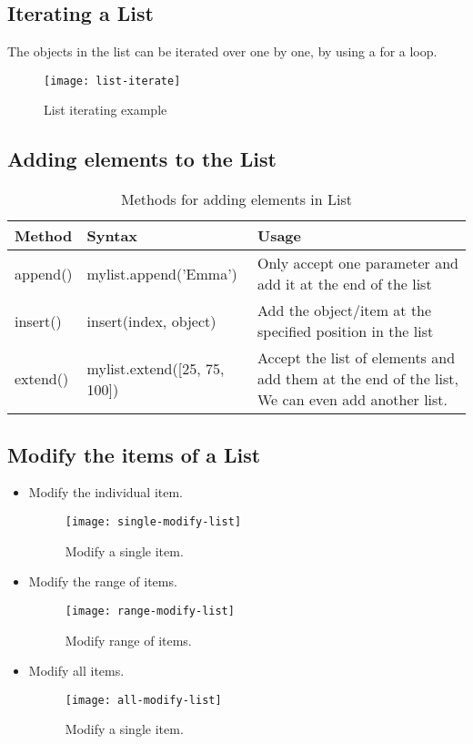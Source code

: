 \subsection{Iterating a List}
The objects in the list can be iterated over one by one, by using a for a loop.
\begin{figure}[h]
	\centering
	\texttt{[image: list-iterate]}
	\caption{List iterating example}
	\label{fig:list-iterate}
\end{figure}

\subsection{Adding elements to the List}
\begin{table}[h!]
	\centering
	\begin{tabularx}{\textwidth}{|l|l|X|}
		\hline
		\textbf{Method} & \textbf{Syntax} & \textbf{Usage} \\
		\hline
		append() & mylist.append('Emma') & Only accept one parameter and add it at the end of the list \\
		\hline
		insert() & insert(index, object) & Add the object/item at the specified position in the list \\
		\hline
		extend() & mylist.extend([25, 75, 100]) & Accept the list of elements and add them at the end of the list, We can even add another list. \\
		\hline

	\end{tabularx}
	\caption{Methods for adding elements in List}
	\label{tab:list-add-opers}
\end{table}

\subsection{Modify the items of a List}

\begin{itemize}
	\item Modify the individual item.
		\begin{figure}[h]
			\centering
			\texttt{[image: single-modify-list]}
			\caption{Modify a single item.}
			\label{fig:list-single-modify-list}
		\end{figure}
	\newpage
	\item Modify the range of items.
		\begin{figure}[h]
			\centering
			\texttt{[image: range-modify-list]}
			\caption{Modify range of items.}
			\label{fig:list-range-modify-list}
		\end{figure}
	\item Modify all items.
		\begin{figure}[h]
			\centering
			\texttt{[image: all-modify-list]}
			\caption{Modify a single item.}
			\label{fig:list-all-modify-list}
		\end{figure}
\end{itemize}

